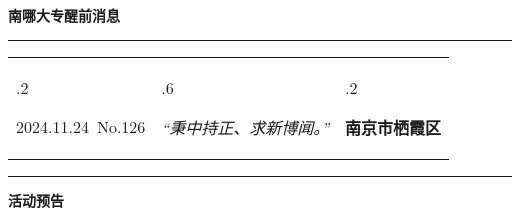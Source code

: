 \documentclass[letterpaper, 12pt]{article}
\begin{document}
\begin{center}
    \Huge\textbf{南哪大专醒前消息}
\end{center}
\vspace{4mm}
\hrule
\renewcommand\tabularxcolumn[1]{m{#1}}
\begin{tabularx}{\textwidth}{>{\hsize.2\hsize}X>{\hsize.6\hsize}X>{\hsize.2\hsize}X}
    \begin{flushleft}
        2024.11.24\, No.126
    \end{flushleft}
    &
    \begin{center}
        \textit{“秉中持正、求新博闻。”}
    \end{center}
    &
    \begin{flushright}
        \textbf{南京市栖霞区}
    \end{flushright}
\end{tabularx}
\vspace{-3.5mm}
\hrule
\vspace{4mm}
\centerline{\huge\textbf{活动预告}}
\end{document}
